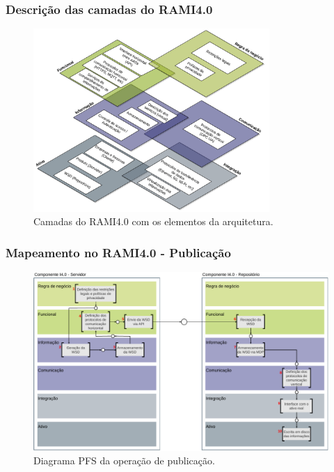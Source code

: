 \documentclass[10pt]{beamer}
\begin{document}
\begin{frame}
	\frametitle{Descrição das camadas do RAMI4.0}
	
	\begin{figure}[H]
		\centering
		\caption{Camadas do RAMI4.0 com os elementos da arquitetura.}
		\label{fig:webservice-rami}
		\includegraphics[width=0.8\textwidth]{webservice-rami}
	\end{figure}
	
\end{frame}
\begin{frame}
	\frametitle{Mapeamento no RAMI4.0 - Publicação}
	
	\begin{figure}[htb]
		\centering
		\caption{Diagrama PFS da operação de publicação.}
		\label{fig:rami-publicacao}
		\includegraphics[width=1\textwidth]{rami-publicacao}
	\end{figure}
	
\end{frame}
\end{document}
